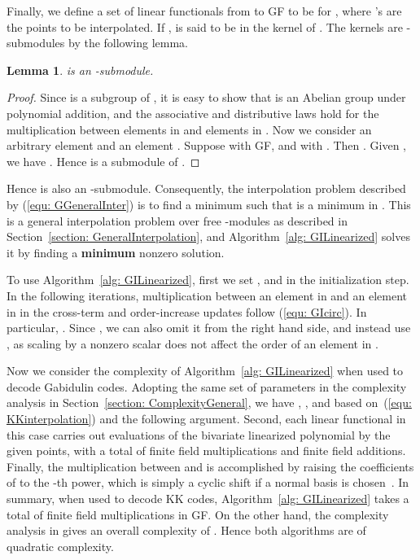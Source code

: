 \documentclass[11pt,onecolumn,draftcls]{IEEEtran}
\newtheorem{lemma}{Lemma}
\begin{document}
Finally, we define a set of linear functionals  from  to GF to be  for , where 's are the points to be interpolated. If ,  is said to be in the kernel  of . The kernels are -submodules by the following lemma.

\begin{lemma} \label{lemma: LxKernels}
 is an -submodule.
\end{lemma}
\begin{proof}
Since  is a subgroup of , it is easy to show that  is an Abelian group under polynomial addition, and the associative  and distributive laws hold for the multiplication between elements in  and elements in . Now we consider an arbitrary element  and an element . Suppose  with  GF, and  with . Then . Given , we have  . Hence  is a submodule of .
\end{proof}

Hence  is also an -submodule. Consequently, the interpolation problem described by (\ref{equ: GGeneralInter}) is to find a minimum  such that  is a minimum in . This is a general interpolation problem over free -modules as described in Section~\ref{section: GeneralInterpolation}, and Algorithm~\ref{alg: GILinearized} solves it by finding a \textbf{minimum} nonzero solution.

To use Algorithm~\ref{alg: GILinearized}, first we set , and  in the initialization step. In the following iterations, multiplication between an element in  and an element in  in the cross-term and order-increase updates follow (\ref{equ: GIcirc}). In particular, . Since , we can also omit it from the right hand side, and instead use , as scaling by a nonzero scalar does not affect the order of an element in .

Now we consider the complexity of Algorithm~\ref{alg: GILinearized} when used to decode Gabidulin codes. Adopting the same set of parameters in the complexity analysis in Section~\ref{section: ComplexityGeneral}, we have , , and  based on~(\ref{equ: KKinterpolation}) and the following argument. Second, each linear functional in this case carries out evaluations of the bivariate linearized polynomial by the given points, with a total of  finite field multiplications and   finite field additions.
Finally, the multiplication between  and  is accomplished by raising the coefficients of  to the -th power, which is simply a cyclic shift if a normal basis is chosen~\cite{silva_isit09}\cite{max_ciss08}.
In summary, when used to decode KK codes, Algorithm~\ref{alg: GILinearized} takes a total of  finite field multiplications in GF.  On the other hand, the complexity analysis in \cite{Loidreau_wcc06} gives an overall complexity of . Hence both algorithms are of quadratic complexity.
\end{document}
